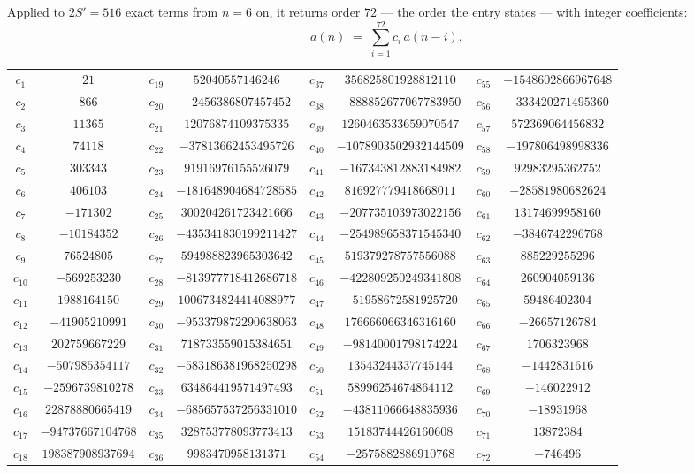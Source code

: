 \documentclass[11pt,a4paper]{article}
\theoremstyle{plain}
\theoremstyle{definition}
\begin{document}
Applied to $2S'=516$ exact terms from $n=6$ on, it returns order $72$ --- the
order the entry states --- with integer coefficients:
\[
a(n)\;=\;\sum_{i=1}^{72}c_i\,a(n-i),
\]
\begin{center}\small
\begin{tabular}{cccccccc}
$c_{1}$ & $21$ & $c_{19}$ & $52040557146246$ & $c_{37}$ & $356825801928812110$ & $c_{55}$ & $-1548602866967648$ \\
$c_{2}$ & $866$ & $c_{20}$ & $-2456386807457452$ & $c_{38}$ & $-888852677067783950$ & $c_{56}$ & $-333420271495360$ \\
$c_{3}$ & $11365$ & $c_{21}$ & $12076874109375335$ & $c_{39}$ & $1260463533659070547$ & $c_{57}$ & $572369064456832$ \\
$c_{4}$ & $74118$ & $c_{22}$ & $-37813662453495726$ & $c_{40}$ & $-1078903502932144509$ & $c_{58}$ & $-197806498998336$ \\
$c_{5}$ & $303343$ & $c_{23}$ & $91916976155526079$ & $c_{41}$ & $-167343812883184982$ & $c_{59}$ & $92983295362752$ \\
$c_{6}$ & $406103$ & $c_{24}$ & $-181648904684728585$ & $c_{42}$ & $816927779418668011$ & $c_{60}$ & $-28581980682624$ \\
$c_{7}$ & $-171302$ & $c_{25}$ & $300204261723421666$ & $c_{43}$ & $-207735103973022156$ & $c_{61}$ & $13174699958160$ \\
$c_{8}$ & $-10184352$ & $c_{26}$ & $-435341830199211427$ & $c_{44}$ & $-254989658371545340$ & $c_{62}$ & $-3846742296768$ \\
$c_{9}$ & $76524805$ & $c_{27}$ & $594988823965303642$ & $c_{45}$ & $519379278757556088$ & $c_{63}$ & $885229255296$ \\
$c_{10}$ & $-569253230$ & $c_{28}$ & $-813977718412686718$ & $c_{46}$ & $-422809250249341808$ & $c_{64}$ & $260904059136$ \\
$c_{11}$ & $1988164150$ & $c_{29}$ & $1006734824414088977$ & $c_{47}$ & $-51958672581925720$ & $c_{65}$ & $59486402304$ \\
$c_{12}$ & $-41905210991$ & $c_{30}$ & $-953379872290638063$ & $c_{48}$ & $176666066346316160$ & $c_{66}$ & $-26657126784$ \\
$c_{13}$ & $202759667229$ & $c_{31}$ & $718733559015384651$ & $c_{49}$ & $-98140001798174224$ & $c_{67}$ & $1706323968$ \\
$c_{14}$ & $-507985354117$ & $c_{32}$ & $-583186381968250298$ & $c_{50}$ & $13543244337745144$ & $c_{68}$ & $-1442831616$ \\
$c_{15}$ & $-2596739810278$ & $c_{33}$ & $634864419571497493$ & $c_{51}$ & $58996254674864112$ & $c_{69}$ & $-146022912$ \\
$c_{16}$ & $22878880665419$ & $c_{34}$ & $-685657537256331010$ & $c_{52}$ & $-43811066648835936$ & $c_{70}$ & $-18931968$ \\
$c_{17}$ & $-94737667104768$ & $c_{35}$ & $328753778093773413$ & $c_{53}$ & $15183744426160608$ & $c_{71}$ & $13872384$ \\
$c_{18}$ & $198387908937694$ & $c_{36}$ & $9983470958131371$ & $c_{54}$ & $-2575882886910768$ & $c_{72}$ & $-746496$ \\
\end{tabular}
\end{center}
\end{document}
